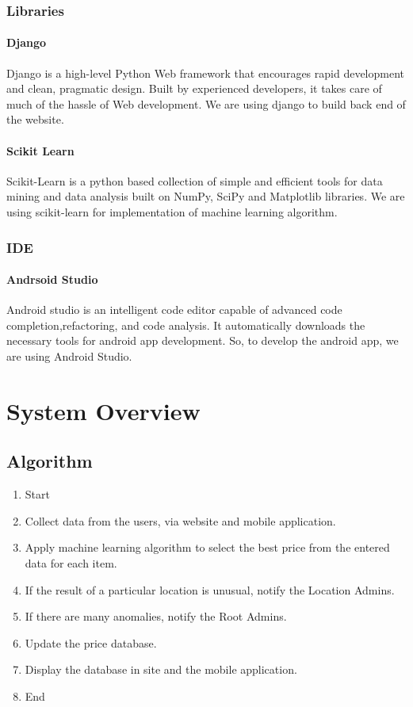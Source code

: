 \documentclass[12ptpt,a4paper]{article}
\begin{document}
			\subsubsection{Libraries}
				\paragraph{Django}Django is a high-level Python Web framework that encourages rapid development and clean, pragmatic design. Built by experienced developers, it takes care of much of the hassle of Web development\cite{django}. We are using django to build back end of the website.
				\paragraph{Scikit Learn}Scikit-Learn is a python based collection of simple and efficient tools for data mining and data analysis built on NumPy, SciPy and Matplotlib libraries\cite{sclearn}. We are using scikit-learn for implementation of machine learning algorithm.
			\subsubsection{IDE}
				\paragraph{Andrsoid Studio} Android studio is an intelligent code editor capable of advanced code completion,refactoring, and code analysis. It automatically downloads the necessary tools for android app development\cite{android}. So, to develop the android app, we are using Android Studio.
	\newpage		
	\section{System Overview}	
		\subsection{Algorithm}
		\begin{enumerate}[{Step}~1:]			
			\item Start
			\item Collect data from the users, via website and mobile application.
			\item Apply machine learning algorithm to select the best price from the entered data for each item. 
			\item If the result of a particular location is unusual, notify the Location Admins.
			\item If there are many anomalies, notify the Root Admins.
			\item Update the price database.
			\item Display the database in site and the mobile application.
			\item End
		\end{enumerate}
	\newpage	
\end{document}
